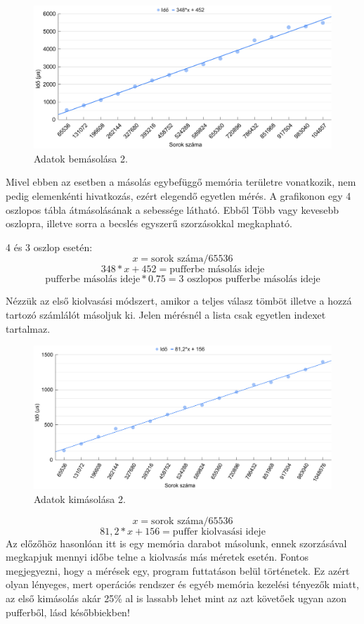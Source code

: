 \begin{figure}[h!]
\centering
\includegraphics[width=\textwidth]{images/graph/pufferin.png}
\caption{Adatok bemásolása 2.}
\label{fig:schema}
\end{figure}
Mivel ebben az esetben a másolás egybefüggő memória területre vonatkozik, nem pedig elemenkénti hivatkozás, ezért elegendő egyetlen mérés.
A grafikonon egy 4 oszlopos tábla átmásolásának a sebessége látható. Ebből Több vagy kevesebb oszlopra, illetve sorra a becslés egyszerű szorzásokkal megkapható.

4 és 3 oszlop esetén:
$$ x = \text{sorok száma} / 65536 $$
$$ 348*x + 452 = \text{pufferbe másolás ideje} $$ 
$$ \text{pufferbe másolás ideje} * 0.75 = \text{3 oszlopos pufferbe másolás ideje}  $$




Nézzük az első kiolvasási módszert, amikor a teljes válasz tömböt illetve a hozzá tartozó számlálót másoljuk ki.
Jelen mérésnél a lista csak egyetlen indexet tartalmaz. 

\begin{figure}[h!]
\centering
\includegraphics[width=\textwidth]{images/graph/pufferout.png}
\caption{Adatok kimásolása 2.}
\label{fig:schema}
\end{figure}
$$ x = \text{sorok száma} / 65536 $$
$$ 81,2*x + 156 = \text{puffer kiolvasási ideje} $$ 
Az előzőhöz hasonlóan itt is egy memória darabot másolunk, ennek szorzásával megkapjuk mennyi időbe telne a kiolvasás más méretek esetén.
Fontos megjegyezni, hogy a mérések egy, program futtatáson belül történetek. Ez azért olyan lényeges, mert operációs rendszer és egyéb memória kezelési tényezők miatt, az első kimásolás akár 25\% al is lassabb lehet mint az azt követőek ugyan azon pufferből, lásd későbbiekben!


